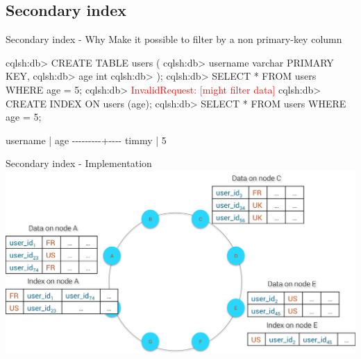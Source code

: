 \documentclass[
  10pt
]{beamer}
\begin{document}
\subsection{Secondary index}  %

\begin{frame}[fragile]{Secondary index - Why}
  Make it possible to filter by a non primary-key column
  \begin{semiverbatim}
  cqlsh:db> CREATE TABLE users (
  cqlsh:db>  username varchar PRIMARY KEY,
  cqlsh:db>  age int
  cqlsh:db> );
  cqlsh:db> SELECT * FROM users WHERE age = 5;
  cqlsh:db> \textcolor{red}{InvalidRequest: [might filter data]}
  cqlsh:db> CREATE INDEX ON users (age);
  cqlsh:db> SELECT * FROM users WHERE age = 5;

   username | age
   \--\--\--\--\--\--\--\--\--+\--\--\--\--
      timmy |   5
  \end{semiverbatim}
\end{frame}

\begin{frame}{Secondary index - Implementation}
  \includegraphics[width=1.0\textwidth]{resources/distributed_index.png}
\end{frame}
\end{document}
